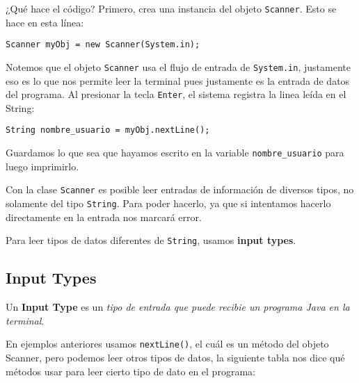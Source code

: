 \documentclass[12pt]{article}
\theoremstyle{largebreak}
\begin{document}
    ¿Qué hace el código? Primero, crea una instancia del objeto \lstinline|Scanner|. Esto se hace en esta línea:
    \begin{center}
        \lstinline|Scanner myObj = new Scanner(System.in);|
    \end{center}
    Notemos que el objeto \lstinline|Scanner| usa el flujo de entrada de \lstinline|System.in|, justamente eso es lo que nos permite leer la terminal pues justamente es la entrada de datos del programa. Al presionar la tecla \texttt{Enter}, el sistema registra la linea leída en el String:
    \begin{center}
        \lstinline|String nombre_usuario = myObj.nextLine();|
    \end{center}
    Guardamos lo que sea que hayamos escrito en la variable \lstinline|nombre_usuario| para luego imprimirlo.

    \begin{obs}
        Con la clase \lstinline|Scanner| es posible leer entradas de información de diversos tipos, no solamente del tipo \lstinline|String|. Para poder hacerlo, ya que si intentamos hacerlo directamente en la entrada nos marcará error.
    \end{obs}

    Para leer tipos de datos diferentes de \lstinline|String|, usamos \textbf{input types}.

    \subsection{Input Types}

    \begin{mydef}
        Un \textbf{Input Type} es un \textit{tipo de entrada que puede recibie un programa Java en la terminal}.
    \end{mydef}

    En ejemplos anteriores usamos \lstinline|nextLine()|, el cuál es un método del objeto Scanner, pero podemos leer otros tipos de datos, la siguiente tabla nos dice qué métodos usar para leer cierto tipo de dato en el programa:
\end{document}
